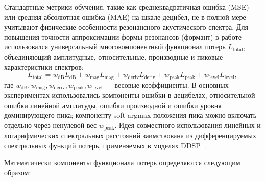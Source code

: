 Стандартные метрики обучения, такие как среднеквадратичная ошибка (MSE) или средняя абсолютная ошибка (MAE) на шкале децибел, не в полной мере учитывают физические особенности резонансного акустического спектра. Для повышения точности аппроксимации формы резонансов (формант) в работе использовался универсальный многокомпонентный функционал потерь $L_{\text{total}}$, объединяющий амплитудные, относительные, производные и пиковые характеристики спектров:
\begin{equation}
    L_{\text{total}} = w_{\text{dB}} L_{\text{dB}} + w_{\text{mag}} L_{\text{mag}} + w_{\text{deriv}} L_{\text{deriv}} + w_{\text{peak}} L_{\text{peak}} + w_{\text{level}} L_{\text{level}},
\end{equation}
где $w_{\text{dB}}, w_{\text{mag}}, w_{\text{deriv}}, w_{\text{peak}}, w_{\text{level}}$ — весовые коэффициенты. В основных экспериментах использовались компоненты ошибки в децибелах, относительной ошибки линейной амплитуды, ошибки производной и ошибки уровня доминирующего пика; компоненту soft-argmax положения пика можно включать отдельно через ненулевой вес $w_{\text{peak}}$. Идея совместного использования линейных и логарифмических спектральных расстояний заимствована из дифференцируемых спектральных функций потерь, применяемых в моделях DDSP~\cite{engel2020ddsp}.

Математически компоненты функционала потерь определяются следующим образом:

